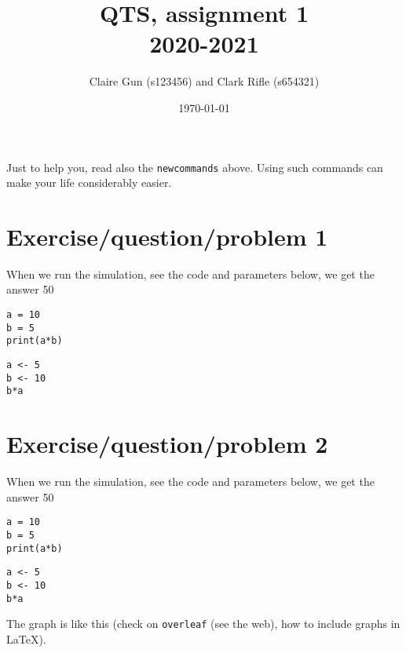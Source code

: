 \documentclass[a4paper,11pt]{article}
\author{Claire Gun (s123456) and Clark Rifle (s654321)}
\date{\today}
\title{QTS, assignment 1\\
  2020-2021
  }
\newcommand{\1}[1]{\,I_{#1}} %
\begin{document}
\maketitle

Just to help you, read also the \verb|newcommands| above. Using such commands can make your life considerably easier.

\section{Exercise/question/problem 1}



When we run the simulation, see the code and parameters below, we get the answer 50

\begin{verbatim}
a = 10
b = 5
print(a*b)
\end{verbatim}


\begin{verbatim}
a <- 5
b <- 10
b*a
\end{verbatim}

\section{Exercise/question/problem 2}

When we run the simulation, see the code and parameters below, we get the answer 50

\begin{verbatim}
a = 10
b = 5
print(a*b)
\end{verbatim}

\begin{verbatim}
a <- 5
b <- 10
b*a
\end{verbatim}

The graph is like this (check on \texttt{overleaf} (see the web), how to include graphs in \LaTeX).
\end{document}
